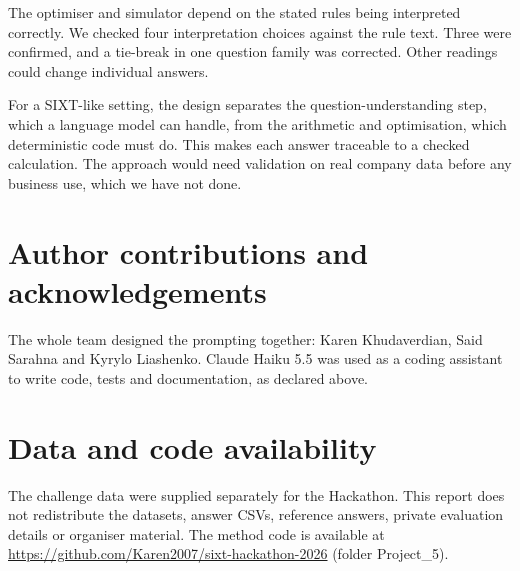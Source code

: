 \documentclass[11pt,a4paper]{article}
\begin{document}
The optimiser and simulator depend on the stated rules being interpreted
correctly. We checked four interpretation choices against the rule text. Three were confirmed, and a tie-break in one question family was corrected. Other readings could change individual answers.

For a SIXT-like setting, the design separates the question-understanding step,
which a language model can handle, from the arithmetic and optimisation, which
deterministic code must do. This makes each answer traceable to a checked
calculation. The approach would need validation on real company data before any
business use, which we have not done.

\section*{Author contributions and acknowledgements}
The whole team designed the prompting together: Karen Khudaverdian, Said Sarahna and
Kyrylo Liashenko. Claude Haiku 5.5 was used as a coding assistant to write code, tests and
documentation, as declared above.

\section*{Data and code availability}
The challenge data were supplied separately for the Hackathon. This report does
not redistribute the datasets, answer CSVs, reference answers, private evaluation
details or organiser material.
The method code is available at \url{https://github.com/Karen2007/sixt-hackathon-2026}
(folder Project\_5).



\end{document}
